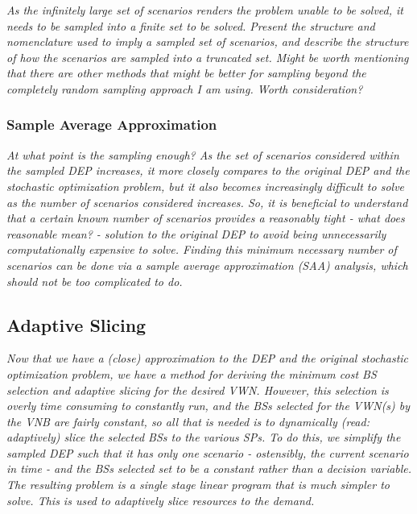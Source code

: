 \documentclass[12pt,dvipsnames]{report}
\begin{document}
\textit{As the infinitely large set of scenarios renders the problem unable to be solved, it needs to be sampled into a finite set to be solved.  Present the structure and nomenclature used to imply a sampled set of scenarios, and describe the structure of how the scenarios are sampled into a truncated set.  Might be worth mentioning that there are other methods that might be better for sampling beyond the completely random sampling approach I am using.  Worth consideration?}

\subsubsection{Sample Average Approximation} \label{subsubsec:dep_sampling_saa}

\textit{At what point is the sampling enough?  As the set of scenarios considered within the sampled DEP increases, it more closely compares to the original DEP and the stochastic optimization problem, but it also becomes increasingly difficult to solve as the number of scenarios considered increases.  So, it is beneficial to understand that a certain known number of scenarios provides a reasonably tight - what does reasonable mean? - solution to the original DEP to avoid being unnecessarily computationally expensive to solve.  Finding this minimum necessary number of scenarios can be done via a sample average approximation (SAA) analysis, which should not be too complicated to do.}

\subsection{Adaptive Slicing} \label{subsec:dep_slicing}

\textit{Now that we have a (close) approximation to the DEP and the original stochastic optimization problem, we have a method for deriving the minimum cost BS selection and adaptive slicing for the desired VWN.  However, this selection is overly time consuming to constantly run, and the BSs selected for the VWN(s) by the VNB are fairly constant, so all that is needed is to dynamically (read: adaptively) slice the selected BSs to the various SPs.  To do this, we simplify the sampled DEP such that it has only one scenario - ostensibly, the current scenario in time - and the BSs selected set to be a constant rather than a decision variable.  The resulting problem is a single stage linear program that is much simpler to solve.  This is used to adaptively slice resources to the demand.}
\end{document}
